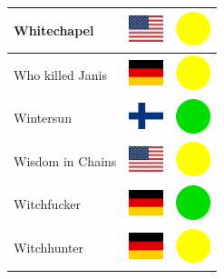 \documentclass[12pt, a4paper, twoside]{report}
\begin{document}
\begin{center}
\begin{longtable}{|p{5cm}|p{2cm}|p{2cm}|}
 Whitechapel                                                & \includegraphics[width=1cm]{../4x3/us} &   \includegraphics[width=1cm]{../likes/m} \\ \hline
 Who killed Janis                                           & \includegraphics[width=1cm]{../4x3/de} &   \includegraphics[width=1cm]{../likes/m} \\ \hline
 Wintersun                                                  & \includegraphics[width=1cm]{../4x3/fi} &   \includegraphics[width=1cm]{../likes/y} \\ \hline
 Wisdom in Chains                                           & \includegraphics[width=1cm]{../4x3/us} &   \includegraphics[width=1cm]{../likes/m} \\ \hline
 Witchfucker                                                & \includegraphics[width=1cm]{../4x3/de} &   \includegraphics[width=1cm]{../likes/y} \\ \hline
 Witchhunter                                                & \includegraphics[width=1cm]{../4x3/de} &   \includegraphics[width=1cm]{../likes/m} \\ \hline

\end{longtable}
\end{center}
\end{document}

